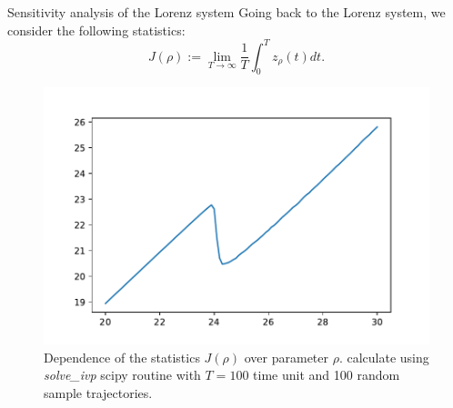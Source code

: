\documentclass{beamer}
\begin{document}
\begin{frame}{Sensitivity analysis of the Lorenz system}
	Going back to the Lorenz system, we consider the following statistics:
	\begin{equation}
		J(\rho) := \lim_{T\rightarrow \infty} \frac{1}{T}\int_0^T z_{\rho}(t)dt.
	\end{equation} 
	\begin{figure}[ht]
		\centering
			\centering
			\includegraphics[width=.6\linewidth]{fig/rho-zbar.pdf}
			\caption{Dependence of the statistics $J(\rho)$ over parameter $\rho$. calculate
			using \textit{solve\_ivp} scipy routine with $T=100$ time unit and 100 random sample trajectories.}
	\end{figure}
\end{frame}
\end{document}
